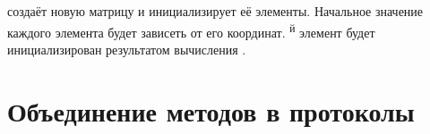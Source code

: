 \documentclass[a4paper,10pt,twoside]{book}
\begin{document}
 создаёт новую матрицу  и инициализирует её элементы. Начальное значение каждого элемента будет зависеть от его координат. \textsuperscript{й} элемент будет инициализирован результатом вычисления .





\section{Объединение методов в протоколы}
\end{document}
